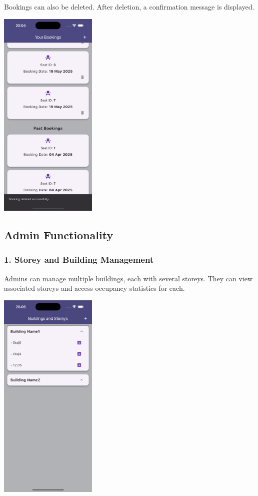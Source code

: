 \documentclass[12pt,a4paper]{report} %
\begin{document}
Bookings can also be deleted. After deletion, a confirmation message is displayed.

\begin{center}
\includegraphics[width=0.35\textwidth]{images/Simulator Screenshot - iPhone 16 Pro Max - 2025-05-19 at 20.04.30.png}
\end{center}

\subsection*{Admin Functionality}

\subsubsection*{1. Storey and Building Management}

Admins can manage multiple buildings, each with several storeys. They can view associated storeys and access occupancy statistics for each.

\begin{center}
\includegraphics[width=0.35\textwidth]{images/Simulator Screenshot - iPhone 16 Pro Max - 2025-05-19 at 20.06.31.png}
\end{center}
\end{document}
